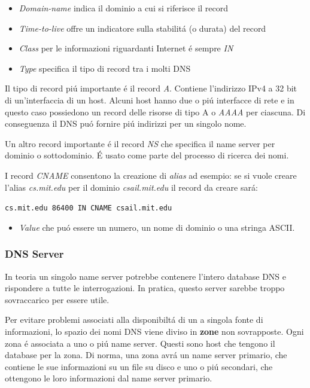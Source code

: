 \documentclass[12pt]{article}
\def\code#1{\texttt{#1}}
\begin{document}
\begin{itemize}
	\item \textit{Domain-name} indica il dominio a cui si riferisce il record
	\item \textit{Time-to-live} offre un indicatore sulla stabilit\'a (o durata) del record
	\item \textit{Class} per le informazioni riguardanti Internet \'e sempre \textit{IN}
	\item \textit{Type} specifica il tipo di record tra i molti DNS
\end{itemize}
Il tipo di record pi\'u importante \'e il record \textit{A}. Contiene l'indirizzo IPv4 a 32 bit di un'interfaccia di un host. 
Alcuni host hanno due o pi\'u interfacce di rete  e in questo caso possiedono un record delle risorse di tipo A o \textit{AAAA} 
per ciascuna. Di conseguenza il DNS pu\'o fornire pi\'u indirizzi per un singolo nome.

Un altro record importante \'e il record \textit{NS} che specifica il name server per dominio o sottodominio. \'E usato come 
parte del processo di ricerca dei nomi.

I record \textit{CNAME} consentono la creazione di \textit{alias} ad esempio: se si vuole creare l'alias \textit{cs.mit.edu} per 
il dominio \textit{csail.mit.edu} il record da creare sar\'a:
\begin{center}
	\code{cs.mit.edu 86400 IN CNAME csail.mit.edu}
\end{center}
\begin{itemize}
	\item \textit{Value} che pu\'o essere un numero, un nome di dominio o una stringa ASCII.
\end{itemize}

\clearpage
\subsubsection{DNS Server}\label{dns-dns-server}
In teoria un singolo name server potrebbe contenere l'intero database DNS e rispondere a tutte le interrogazioni. In pratica, 
questo server sarebbe troppo sovraccarico per essere utile.

Per evitare problemi associati alla disponibilt\'a di un a singola fonte di informazioni, lo spazio dei nomi DNS viene diviso in 
\textbf{zone} non sovrapposte. Ogni zona \'e associata a uno o pi\'u name server. Questi sono host che tengono il database per 
la zona. Di norma, una zona avr\'a un name server primario, che contiene le sue informazioni su un file su disco e uno o pi\'u 
secondari, che ottengono le loro informazioni dal name server primario.
\end{document}
